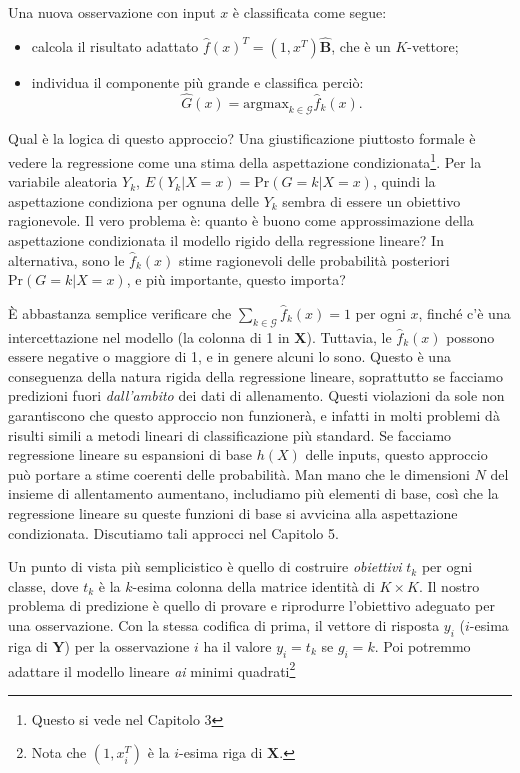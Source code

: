 \documentclass[11pt,openany]{book}
\begin{document}
Una nuova osservazione con input $x$ è classificata come segue:
\begin{itemize}
\item calcola il risultato adattato $\hat{f}(x)^T = (1, x^T)\hat{\mathbf{B}}$, che è un $K$-vettore;
\item individua il componente più grande e classifica perciò:
\begin{equation}
\label{eq4-4}
\hat{G}(x) = \text{argmax}_{k \in \mathcal{G}} \hat{f}_k (x).
\end{equation}
\end{itemize}

Qual è la logica di questo approccio? Una giustificazione piuttosto formale è vedere la regressione come una stima della aspettazione condizionata\footnote{Questo si vede nel Capitolo 3}. Per la variabile aleatoria $Y_k$, $E(Y_k | X = x) = \text{Pr}(G = k | X = x)$, quindi la aspettazione condiziona per ognuna delle $Y_k$ sembra di essere un obiettivo ragionevole. Il vero problema è: quanto è buono come approssimazione della aspettazione condizionata il modello rigido della regressione lineare? In alternativa, sono le $\hat{f}_k (x)$ stime ragionevoli delle probabilità posteriori $\text{Pr}(G = k | X = x)$, e più importante, questo importa?

È abbastanza semplice verificare che $\sum_{k \in \mathcal{G}}{\hat{f}_k (x)} = 1$ per ogni $x$, finché c'è una intercettazione nel modello (la colonna di 1 in $\mathbf{X}$). Tuttavia, le $\hat{f}_k (x)$ possono essere negative o maggiore di 1, e in genere alcuni lo sono. Questo è una conseguenza della natura rigida della regressione lineare, soprattutto se facciamo predizioni fuori \textit{dall'ambito} dei dati di allenamento. Questi violazioni da sole non garantiscono che questo approccio non funzionerà, e infatti in molti problemi dà risulti simili a metodi lineari di classificazione più standard. Se facciamo regressione lineare su espansioni di base $h(X)$ delle inputs, questo approccio può portare a stime coerenti delle probabilità. Man mano che le dimensioni $N$ del insieme di allentamento aumentano, includiamo più elementi di base, così che la regressione lineare su queste funzioni di base si avvicina alla aspettazione condizionata. Discutiamo tali approcci nel Capitolo 5.

Un punto di vista più semplicistico è quello di costruire \textit{obiettivi} $t_k$ per ogni classe, dove $t_k$ è la $k$-esima colonna della matrice identità di $K \times K$. Il nostro problema di predizione è quello di provare e riprodurre l'obiettivo adeguato per una osservazione. Con la stessa codifica di prima, il vettore di risposta $y_i$ ($i$-esima riga di $\mathbf{Y}$) per la osservazione $i$ ha il valore $y_i = t_k$ se $g_i = k$. Poi potremmo adattare il modello lineare \textit{ai} minimi quadrati\footnote{Nota che $(1, x_i^T)$ è la $i$-esima riga di $\mathbf{X}$.}
\end{document}
